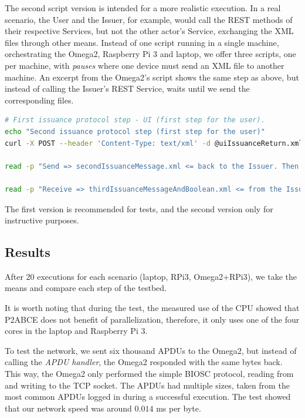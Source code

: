 \documentclass[journal]{IEEEtran}
\begin{document}
The second script version is intended for a more realistic execution. In a real scenario, the User and the Issuer, for example, would call the REST methods of their respective Services, but not the other actor's Service, exchanging the XML files through other means. Instead of one script running in a single machine, orchestrating the Omega2, Raspberry Pi 3 and laptop, we offer three scripts, one per machine, with \textit{pauses} where one device must send an XML file to another machine. An excerpt from the Omega2's script shows the same step as above, but instead of calling the Issuer's REST Service, waits until we send the corresponding files.

\begin{lstlisting}[language=bash]	
# First issuance protocol step - UI (first step for the user).
echo "Second issuance protocol step (first step for the user)"
curl -X POST --header 'Content-Type: text/xml' -d @uiIssuanceReturn.xml "http://$Rpi3IP:9200/user/issuanceProtocolStepUi/" > secondIssuanceMessage.xml

read -p "Send => secondIssuanceMessage.xml <= back to the Issuer. Then press any key to continue... " -n1 -s

read -p "Receive => thirdIssuanceMessageAndBoolean.xml <= from the Issuer. Then press any key to continue... " -n1 -s
\end{lstlisting}


\hfil

The first version is recommended for tests, and the second version only for instructive purposes.


\subsection{Results}

After 20 executions for each scenario (laptop, RPi3, Omega2+RPi3), we take the means and compare each step of the testbed.

It is worth noting that during the test, the measured use of the CPU showed that P2ABCE does not benefit of parallelization, therefore, it only uses one of the four cores in the laptop and Raspberry Pi 3.

To test the network, we sent six thousand APDUs to the Omega2, but instead of calling the \textit{APDU handler}, the Omega2 responded with the same bytes back. This way, the Omega2 only performed the simple BIOSC protocol, reading from and writing to the TCP socket.
The APDUs had multiple sizes, taken from the most common APDUs logged in during a successful execution. The test showed that our network speed was around $0.014$ ms per byte.
\end{document}

